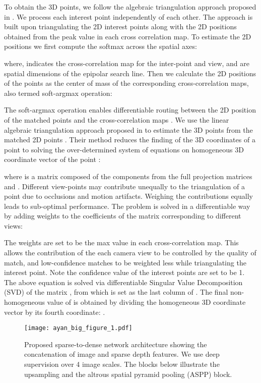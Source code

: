 \documentclass[runningheads]{llncs}
\begin{document}
To obtain the 3D points, we follow the algebraic triangulation approach proposed in \cite{iskakov2019learnable}. We process each interest point  independently of each other. The approach is built upon triangulating the 2D interest points along with the 2D positions obtained from the peak value in each cross correlation map. To estimate the 2D positions we first compute the softmax across the spatial axes:


where,  indicates the cross-correlation map for the  inter-point and  view, and  are spatial dimensions of the epipolar search line. Then we calculate the 2D positions of the points as the center of mass of the corresponding cross-correlation maps, also termed soft-argmax operation:

The soft-argmax operation enables differentiable routing between the 2D position of the matched points  and the cross-correlation maps . We use the linear algebraic triangulation approach proposed in \cite{iskakov2019learnable} to estimate the 3D points from the matched 2D points . Their method reduces the finding of the 3D coordinates of a point  to solving the over-determined system of equations on homogeneous 3D coordinate vector of the point :




where  is a matrix composed of the components from the full projection matrices and . Different view-points may contribute unequally to the triangulation of a point due to occlusions and motion artifacts. Weighing the contributions equally leads to sub-optimal performance. The problem is solved in a differentiable way by adding weights  to the coefficients of the matrix corresponding to different views:

The weights  are set to be the max value in each cross-correlation map. This allows the contribution of the each camera view to be controlled by the quality of match, and low-confidence matches to be weighted less while triangulating the interest point. Note the confidence value of the interest points are set to be 1. The above equation is solved via differentiable Singular Value Decomposition (SVD) of the matrix , from which  is set as the last column of . The final non-homogeneous value of  is obtained by dividing the homogeneous 3D coordinate vector  by its fourth coordinate:  \cite{iskakov2019learnable}. 








\begin{figure}
\centering
\texttt{[image: ayan\_big\_figure\_1.pdf]}
\caption{Proposed sparse-to-dense network architecture showing the concatenation of image and sparse depth features. We use deep supervision over 4 image scales. The blocks below illustrate the upsampling and the altrous spatial pyramid pooling (ASPP) block.} 
\label{sparse2dense}
\end{figure}
\end{document}
